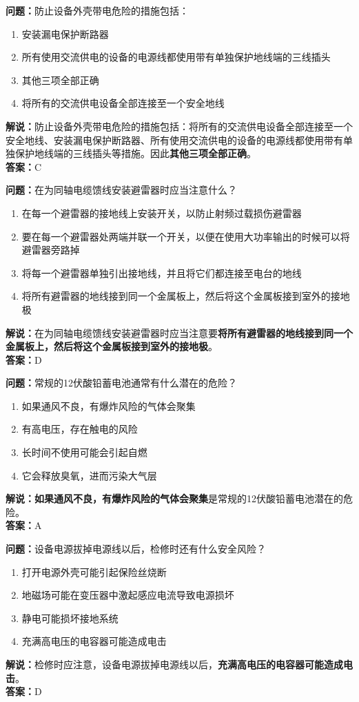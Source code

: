 \textbf{问题：}防止设备外壳带电危险的措施包括：
\begin{enumerate}[label=\Alph*), leftmargin=1.5cm]
	\item 安装漏电保护断路器
	\item 所有使用交流供电的设备的电源线都使用带有单独保护地线端的三线插头
	\item 其他三项全部正确
	\item 将所有的交流供电设备全部连接至一个安全地线
\end{enumerate}
\textbf{解说：}防止设备外壳带电危险的措施包括：将所有的交流供电设备全部连接至一个安全地线、安装漏电保护断路器、所有使用交流供电的设备的电源线都使用带有单独保护地线端的三线插头等措施。因此\textbf{其他三项全部正确}。\\\textbf{答案：}C


\textbf{问题：}在为同轴电缆馈线安装避雷器时应当注意什么？
\begin{enumerate}[label=\Alph*), leftmargin=1.5cm]
	\item 在每一个避雷器的接地线上安装开关，以防止射频过载损伤避雷器
	\item 要在每一个避雷器处两端并联一个开关，以便在使用大功率输出的时候可以将避雷器旁路掉
	\item 将每一个避雷器单独引出接地线，并且将它们都连接至电台的地线
	\item 将所有避雷器的地线接到同一个金属板上，然后将这个金属板接到室外的接地极
\end{enumerate}
\textbf{解说：}在为同轴电缆馈线安装避雷器时应当注意要\textbf{将所有避雷器的地线接到同一个金属板上，然后将这个金属板接到室外的接地极}。\\\textbf{答案：}D


\textbf{问题：}常规的12伏酸铅蓄电池通常有什么潜在的危险？
\begin{enumerate}[label=\Alph*), leftmargin=1.5cm]
	\item 如果通风不良，有爆炸风险的气体会聚集
	\item 有高电压，存在触电的风险
	\item 长时间不使用可能会引起自燃
	\item 它会释放臭氧，进而污染大气层
\end{enumerate}
\textbf{解说：}\textbf{如果通风不良，有爆炸风险的气体会聚集}是常规的12伏酸铅蓄电池潜在的危险。\\\textbf{答案：}A


\textbf{问题：}设备电源拔掉电源线以后，检修时还有什么安全风险？
\begin{enumerate}[label=\Alph*), leftmargin=1.5cm]
	\item 打开电源外壳可能引起保险丝烧断
	\item 地磁场可能在变压器中激起感应电流导致电源损坏
	\item 静电可能损坏接地系统
	\item 充满高电压的电容器可能造成电击
\end{enumerate}
\textbf{解说：}检修时应注意，设备电源拔掉电源线以后，\textbf{充满高电压的电容器可能造成电击}。\\\textbf{答案：}D


